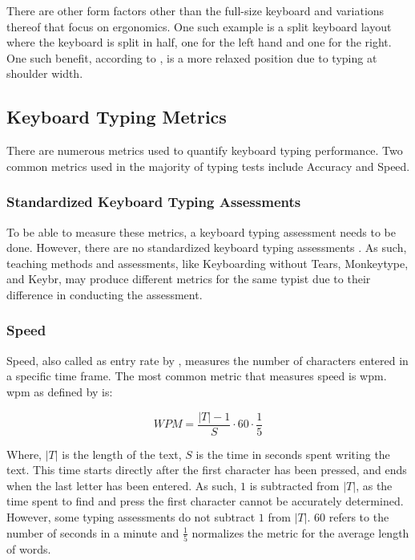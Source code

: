 \documentclass{report}
\newcommand{\labelequations}[1]{%
	\addcontentsline{equ}{equations}{\numberline{\theequation}#1}\par}
\begin{document}
There are other form factors other than the full-size keyboard and variations
thereof that focus on ergonomics. One such example is a split keyboard layout
where the keyboard is split in half, one for the left hand and one for the
right. One such benefit, according to \citeauthor{ergodox}, is a more relaxed
position due to typing at shoulder width.

\subsection{Keyboard Typing Metrics}

There are numerous metrics used to quantify keyboard typing performance. Two
common metrics used in the majority of typing tests include Accuracy and Speed.

\subsubsection{Standardized Keyboard Typing Assessments}

To be able to measure these metrics, a keyboard typing assessment needs to be
done. However, there are no standardized keyboard typing assessments
\parencite{donica2018}. As such, teaching methods and assessments, like
Keyboarding without Tears, Monkeytype, and Keybr, may produce different metrics
for the same typist due to their difference in conducting the assessment.

\subsubsection{Speed}
Speed, also called as entry rate by \citeauthor{arif2009}, measures the number
of characters entered in a specific time frame. The most common metric that
measures speed is \ac{wpm}. \ac{wpm} as defined by \citeauthor{arif2009} is:

\begin{equation}
	WPM = \frac{|T| - 1}{S} \cdot 60 \cdot \frac{1}{5}
	\label{equ:wpm}
\end{equation}
\labelequations{Words per Minute}

Where, $|T|$ is the length of the text, $S$ is the time in seconds spent writing
the text. This time starts directly after the first character has been pressed,
and ends when the last letter has been entered. As such, $1$ is subtracted from
$|T|$, as the time spent to find and press the first character cannot be
accurately determined. However, some typing assessments do not subtract $1$ from
$|T|$. $60$ refers to the number of seconds in a minute and $\frac{1}{5}$
normalizes the metric for the average length of words.
\end{document}
